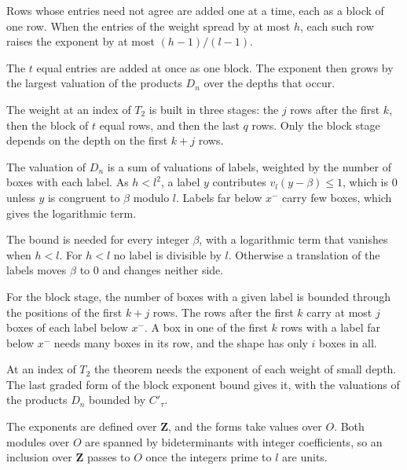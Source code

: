 Rows whose entries need not agree are added one at a time, each as a block of one row. When the entries of
the weight spread by at most $h$, each such row raises the exponent by at most $(h-1)/(l-1)$.

The $t$ equal entries are added at once as one block. The exponent then grows by the largest valuation of
the products $D_n$ over the depths that occur.

The weight at an index of $T_2$ is built in three stages: the $j$ rows after the first $k$, then the block
of $t$ equal rows, and then the last $q$ rows. Only the block stage depends on the depth on the first
$k+j$ rows.

The valuation of $D_n$ is a sum of valuations of labels, weighted by the number of boxes with each label.
As $h<l^2$, a label $y$ contributes $v_l(y-\beta)\le1$, which is $0$ unless $y$ is congruent to $\beta$
modulo $l$. Labels far below $x^-$ carry few boxes, which gives the logarithmic term.

The bound is needed for every integer $\beta$, with a logarithmic term that vanishes when $h<l$. For
$h<l$ no label is divisible by $l$. Otherwise a translation of the labels moves $\beta$ to $0$ and
changes neither side.

For the block stage, the number of boxes with a given label is bounded through the positions of the first
$k+j$ rows. The rows after the first $k$ carry at most $j$ boxes of each label below $x^-$. A box in one of
the first $k$ rows with a label far below $x^-$ needs many boxes in its row, and the shape has only $i$
boxes in all.

At an index of $T_2$ the theorem needs the exponent of each weight of small depth. The last graded form of
the block exponent bound gives it, with the valuations of the products $D_n$ bounded by $C'_\tau$.

The exponents are defined over $\mathbf Z$, and the forms take values over $O$. Both modules over $O$ are
spanned by bideterminants with integer coefficients, so an inclusion over $\mathbf Z$ passes to $O$ once
the integers prime to $l$ are units.

